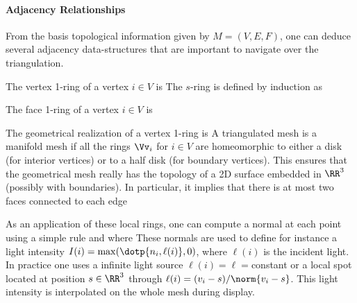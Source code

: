   
\paragraph{Adjacency Relationships}

From the basis topological information given by $M = (V,E,F)$, one can deduce several adjacency data-structures that are important to navigate over the triangulation.

\begin{defn} The vertex 1-ring of a vertex $i \in V$ is 
The $s$-ring is defined by induction as
\end{defn}

\begin{defn} The face 1-ring of a vertex $i \in V$ is 
\end{defn}

The geometrical realization of a vertex 1-ring is
A triangulated mesh is a manifold mesh if all the rings $\Vv_i$ for $i \in V$ are homeomorphic to either a disk (for interior vertices) or to a half disk (for boundary vertices). This ensures that the geometrical mesh really has the topology of a 2D surface embedded in $\RR^3$ (possibly with boundaries). In particular, it implies that there is at most two faces connected to each edge


As an application of these local rings, one can compute a normal at each point using a simple rule
and where
These normals are used to define for instance a light intensity $I(i) = \max(\dotp{n_i,\ell(i)},0)$, where $\ell(i)$ is the incident light. In practice one uses a infinite light source $\ell(i)=\ell=$constant or a local spot located at position $s \in \RR^3$ through $\ell(i)=(v_i-s)/\norm{v_i-s}$. This light intensity is interpolated on the whole mesh during display. 


